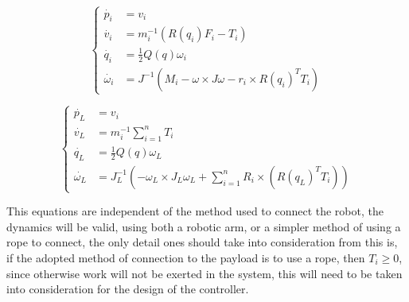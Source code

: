 \begin{equation}
    \begin{cases}
        \dot{p_i} &= v_{i} \\
        \dot{v_i} &= m_i ^{-1}(R(q_i)F_i - T_i) \\
        \dot{q_i} &= \frac{1}{2}Q(q) \omega_i \\
        \dot{\omega_i} &=J^{-1}(M_i - \omega \times J \omega - r_i \times R(q_i)^T T_i)
    \end{cases}
    \label{eq:Proposed Approach:Motion Model: Multiple Robot Dynamics: Robot Dynamics}
\end{equation}

\begin {equation}
    \begin{cases}
        \dot {p_{L}} &= v_{i} \\
        \dot {v_{L}} &= m_{i}^{-1} \sum_{i = 1}^{n} T_{i} \\
        \dot {q_{L}} &=  \frac{1}{2} Q(q) \omega_{L} \\
        \dot{\omega_{L}} &= J_{L}^{-1} (-\omega_{L} \times J_{L} \omega_{L} + \sum_{i = 1}^{n} R_{i} \times (R(q_{L})^T T_{i}))
    \end{cases}
    \label{eq:Proposed Approach:Motion Model: Multiple Robot Dynamics: Payload Dynamics}
\end{equation}

This equations are independent of the method used to connect the robot, the dynamics will be valid, using both a robotic arm, or a simpler method of using a rope to connect, the only detail ones should take into consideration from this is, if the adopted method of connection to the payload is to use a rope, then $T_i \geq 0$, since otherwise work will not be exerted in the system, this will need to be taken into consideration for the design of the controller.
